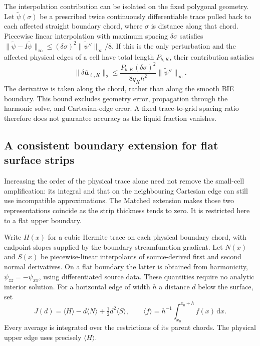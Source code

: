 \documentclass[10pt]{article}
\newcommand{\dd}{\,\mathrm{d}}
\begin{document}
The interpolation contribution can be isolated on the fixed polygonal
geometry. Let $\widetilde\psi(\sigma)$ be a prescribed twice continuously
differentiable trace pulled back to each affected straight boundary chord,
where $\sigma$ is distance along that chord. Piecewise linear interpolation
with maximum spacing $\delta\sigma$ satisfies
$\|\widetilde\psi-I\widetilde\psi\|_\infty
\le(\delta\sigma)^2\|\widetilde\psi''\|_\infty/8$.
If this is the only perturbation and the affected physical edges of a cell
have total length $P_{b,K}$, their contribution satisfies
\begin{equation}
 \|\delta\overline{\boldsymbol u}_{\ell,K}\|_2
 \le \frac{P_{b,K}(\delta\sigma)^2}{8q_Kh^2}
       \|\widetilde\psi''\|_\infty.
 \label{eq:trace-bound}
\end{equation}
The derivative is taken along the chord, rather than along the smooth BIE
boundary. This bound excludes geometry error, propagation through the
harmonic solve, and Cartesian-edge error. A fixed trace-to-grid spacing ratio
therefore does not guarantee accuracy as the liquid fraction vanishes.

\subsection{A consistent boundary extension for flat surface strips}
Increasing the order of the physical trace alone need not remove the
small-cell amplification: its integral and that on the neighbouring
Cartesian edge can still use incompatible approximations. The Matched
extension makes those two representations coincide as the strip
thickness tends to zero. It is restricted here to a flat upper boundary.

Write $H(x)$ for a cubic Hermite trace on each physical boundary chord,
with endpoint slopes supplied by the boundary streamfunction gradient.
Let $N(x)$ and $S(x)$ be piecewise-linear interpolants of source-derived first
and second normal derivatives. On a flat boundary the latter is obtained
from harmonicity, $\psi_{zz}=-\psi_{xx}$, using differentiated source data.
These quantities require no analytic interior solution. For a horizontal
edge of width $h$ a distance $d$ below the surface, set
\begin{equation}
 J(d)=\langle H\rangle-d\langle N\rangle
                   +\tfrac12 d^2\langle S\rangle,
 \qquad \langle f\rangle=h^{-1}\int_{x_0}^{x_0+h}f(x)\dd x.
 \label{eq:matched-jet}
\end{equation}
Every average is integrated over the restrictions of its parent chords.
The physical upper edge uses precisely $\langle H\rangle$.
\end{document}
